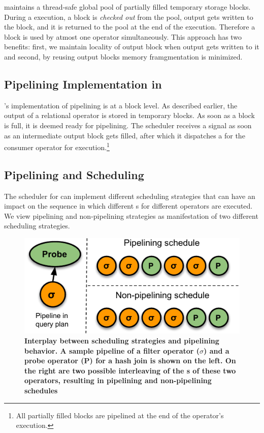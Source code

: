 \sys{} maintains a thread-safe global pool of partially filled temporary storage blocks.
During a \wo{} execution, a block is \textit{checked out} from the pool, output gets written to the block, and it is returned to the pool at the end of the execution. 
Therefore a block is used by atmost one operator \wo{} simultaneously. 
This approach has two benefits: first, we maintain locality of output block when output gets written to it and second, by reusing output blocks memory framgmentation is minimized. 

\subsection{Pipelining Implementation in \sys{}}
\sys{}'s implementation of pipelining is at a block level.
As described earlier, the output of a relational operator \wo{} is stored in temporary blocks.
As soon as a block is full, it is deemed ready for pipelining.
The scheduler receives a signal as soon as an intermediate output block gets filled, after which it dispatches a \wo{} for the consumer operator for execution.\footnote{All partially filled blocks are pipelined at the end of the operator's execution.}


\subsection{Pipelining and Scheduling}\label{ssec:system-scheduling}
The scheduler for \sys{} can implement different scheduling strategies that can have an impact on the sequence in which different \wo{}s for different operators are executed.
We view pipelining and non-pipelining strategies as manifestation of two different scheduling strategies. 

\begin{figure}[t]
	\centering 
	\includegraphics[width=0.5\textheight]{pipeline/figures/Pipe-Nopipe-schedules}
	\caption{\textbf{Interplay between scheduling strategies and pipelining behavior. A sample pipeline of a filter operator ($\sigma$) and a probe operator (P) for a hash join is shown on the left. On the right are two possible interleaving of the \wo{}s of these two operators, resulting in pipelining and non-pipelining schedules}}
	\label{fig:pipelining-schedules}
\end{figure}

